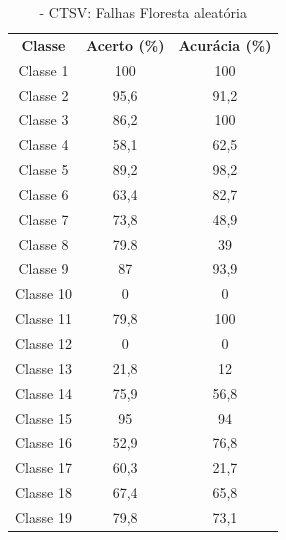 \begin{itemize}
 \begin{table}[ht]
\centering
\begin{tabular}{ccc}
\textbf{Classe} & \textbf{Acerto (\%)} & \textbf{Acurácia (\%)} \\
Classe 1        & 100                  & 100                    \\
Classe 2        & 95,6                  & 91,2                    \\
Classe 3        & 86,2                  & 100                    \\
Classe 4        & 58,1                  & 62,5                    \\
Classe 5        & 89,2                 & 98,2                    \\
Classe 6        & 63,4                  & 82,7                    \\
Classe 7        & 73,8                  & 48,9                    \\
Classe 8        & 79.8                  & 39                    \\
Classe 9        & 87                  & 93,9                    \\
Classe 10       & 0                  & 0                    \\
Classe 11       & 79,8            & 100   
     \\
Classe 12       & 0                 & 0   
     \\
Classe 13      & 21,8                 & 12    
     \\
Classe 14       &  75,9                & 56,8   
     \\
Classe 15       & 95                 & 94
     \\
Classe 16       & 52,9                &    76,8
     \\
Classe 17       & 60,3                & 21,7
     \\
Classe 18     &  67,4              &    65,8 
     \\
Classe 19       & 79,8                 & 73,1    

\end{tabular}
\caption{\label{tab:ctsvnrandom}- CTSV: Falhas Floresta aleatória}
\end{table}



\end{itemize}
